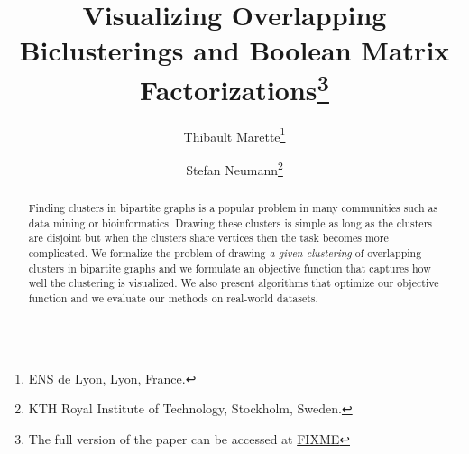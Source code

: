 \documentclass[twoside,leqno,twocolumn]{article}
\theoremstyle{definition}
\begin{document}
%
\newcommand\relatedversion{}
\renewcommand\relatedversion{\thanks{The full version of the paper can be
	accessed at \protect\url{FIXME}}} %



\title{\Large Visualizing Overlapping Biclusterings and Boolean Matrix
	Factorizations\relatedversion}
\author{Thibault Marette\thanks{ENS de Lyon, Lyon, France.}
\and Stefan Neumann\thanks{KTH Royal Institute of Technology, Stockholm, Sweden.}}

\date{}

\maketitle







\begin{abstract} \small\baselineskip=9pt
Finding clusters in bipartite graphs is a popular problem in many communities such as data mining or bioinformatics. Drawing these clusters is simple as long as the clusters are disjoint but when the clusters share vertices then the task becomes more complicated.
We formalize the problem of drawing \emph{a given clustering} of overlapping clusters in bipartite graphs and we formulate an objective function that captures how well the clustering is visualized. We also present algorithms that optimize our objective function and we evaluate our methods on real-world datasets.
\end{abstract}
\end{document}
